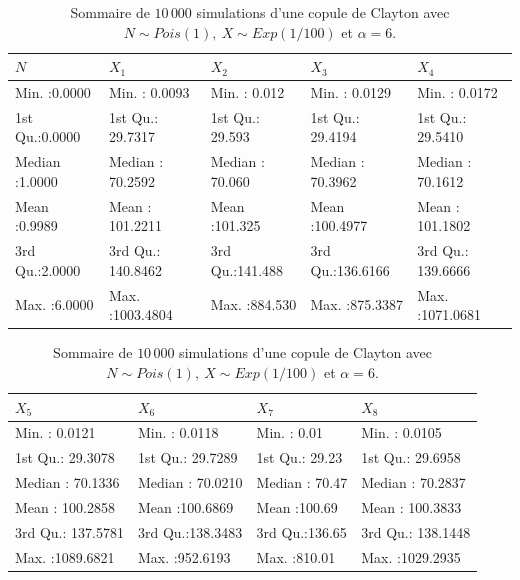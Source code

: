 \documentclass{article}
\begin{document}
	\begin{table}[H]
		\centering
		\begin{tabular}{lllll}
			\hline
			       $N$ &      $X_1$ &      $X_2$ &       $X_3$ &       $X_4$ \\
			\hline
			 Min.   :0.0000   & Min.   :   0.0093   & Min.   :  0.012   & Min.   :  0.0129   & Min.   :   0.0172 \\
			 1st Qu.:0.0000   & 1st Qu.:  29.7317   & 1st Qu.: 29.593   & 1st Qu.: 29.4194   & 1st Qu.:  29.5410 \\
			 Median :1.0000   & Median :  70.2592   & Median : 70.060   & Median : 70.3962   & Median :  70.1612 \\
			 Mean   :0.9989   & Mean   : 101.2211   & Mean   :101.325   & Mean   :100.4977   & Mean   : 101.1802 \\
			 3rd Qu.:2.0000   & 3rd Qu.: 140.8462   & 3rd Qu.:141.488   & 3rd Qu.:136.6166   & 3rd Qu.: 139.6666 \\
			 Max.   :6.0000   & Max.   :1003.4804   & Max.   :884.530   & Max.   :875.3387   & Max.   :1071.0681 \\
			\hline
		\end{tabular}

		\begin{tabular}{llll}
			\hline
			$X_5$ &      $X_6$ &       $X_7$ &       $X_8$ \\ 
			\hline
			Min.   :   0.0121   & Min.   :  0.0118   & Min.   :  0.01   & Min.   :   0.0105   \\ 
			1st Qu.:  29.3078   & 1st Qu.: 29.7289   & 1st Qu.: 29.23   & 1st Qu.:  29.6958   \\ 
			Median :  70.1336   & Median : 70.0210   & Median : 70.47   & Median :  70.2837   \\ 
			Mean   : 100.2858   & Mean   :100.6869   & Mean   :100.69   & Mean   : 100.3833   \\ 
			3rd Qu.: 137.5781   & 3rd Qu.:138.3483   & 3rd Qu.:136.65   & 3rd Qu.: 138.1448   \\ 
			Max.   :1089.6821   & Max.   :952.6193   & Max.   :810.01   & Max.   :1029.2935   \\ 
			\hline
	\end{tabular}
	\caption[Sommaire des données simulées pour une copule de Clayton avec une loi de fréquence de Poisson.]{Sommaire de $10\,000$ simulations d'une copule de Clayton avec $N \sim Pois(1),\ X\sim Exp(1/100)$ et $\alpha=6$.}\label{tbl_sommaire_Clayton_Pois_1}
	\end{table}
	
\end{document}
